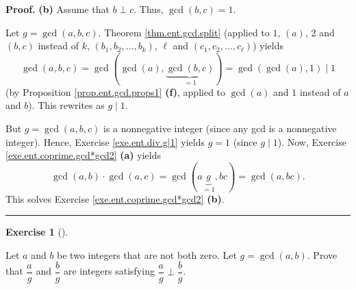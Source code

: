 \documentclass[numbers=enddot,12pt,final,onecolumn,notitlepage]{scrartcl}%
\newcounter{exer}
\numberwithin{exer}{subsection}
\theoremstyle{definition}
\newtheorem{exmp}[exer]{Exercise}
\newenvironment{exercise}[1][]
{\begin{exmp}[#1]\begin{leftbar}}
{\end{leftbar}\end{exmp}}
\newenvironment{proof}[1][Proof]{\noindent\textbf{#1.} }{\ \rule{0.5em}{0.5em}}
\begin{document}
\begin{proof}
\textbf{(b)} Assume that $b\perp c$. Thus, $\gcd\left(  b,c\right)  =1$.

Let $g=\gcd\left(  a,b,c\right)  $. Theorem \ref{thm.ent.gcd.split} (applied
to $1$, $\left(  a\right)  $, $2$ and $\left(  b,c\right)  $ instead of $k$,
$\left(  b_{1},b_{2},\ldots,b_{k}\right)  $, $\ell$ and $\left(  c_{1}%
,c_{2},\ldots,c_{\ell}\right)  $) yields%
\[
\gcd\left(  a,b,c\right)  =\gcd\left(  \gcd\left(  a\right)  ,\underbrace{\gcd
\left(  b,c\right)  }_{=1}\right)  =\gcd\left(  \gcd\left(  a\right)
,1\right)  \mid1
\]
(by Proposition \ref{prop.ent.gcd.props1} \textbf{(f)}, applied to
$\gcd\left(  a\right)  $ and $1$ instead of $a$ and $b$). This rewrites as
$g\mid1$.

But $g=\gcd\left(  a,b,c\right)  $ is a nonnegative integer (since any gcd is
a nonnegative integer). Hence, Exercise \ref{exe.ent.div.g|1} yields $g=1$
(since $g\mid1$). Now, Exercise \ref{exe.ent.coprime.gcd*gcd2} \textbf{(a)}
yields
\[
\gcd\left(  a,b\right)  \cdot\gcd\left(  a,c\right)  =\gcd\left(
a\underbrace{g}_{=1},bc\right)  =\gcd\left(  a,bc\right)  .
\]
This solves Exercise \ref{exe.ent.coprime.gcd*gcd2} \textbf{(b)}.
\end{proof}

\begin{exercise}
\label{exe.ent.coprime.a/g}Let $a$ and $b$ be two integers that are not both
zero. Let $g=\gcd\left(  a,b\right)  $. Prove that $\dfrac{a}{g}$ and
$\dfrac{b}{g}$ are integers satisfying $\dfrac{a}{g}\perp\dfrac{b}{g}$.
\end{exercise}
\end{document}
